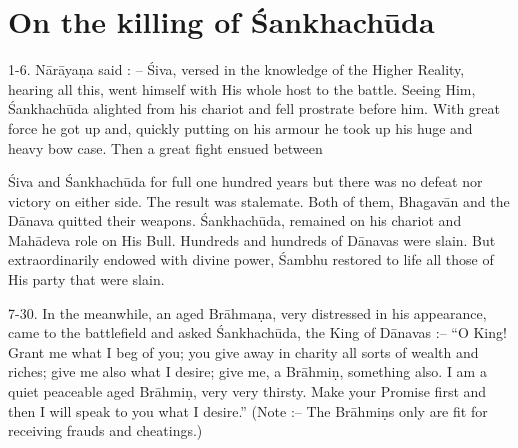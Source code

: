 \chapter{On the killing of \'Sankhach\=uda}

1-6. N\=ar\=aya\d{n}a said : -- \'Siva, versed in the knowledge of the Higher Reality, hearing all this, went himself with His whole host to the battle. Seeing Him, \'Sankhach\=uda alighted from his chariot and fell prostrate before him. With great force he got up and, quickly putting on his armour he took up his huge and heavy bow case. Then a great fight ensued between

\'Siva and \'Sankhach\=uda for full one hundred years but there was no defeat nor victory on either side. The result was stalemate. Both of them, Bhagav\=an and the D\=anava quitted their weapons. \'Sankhach\=uda, remained on his chariot and Mah\=adeva role on His Bull. Hundreds and hundreds of D\=anavas were slain. But extraordinarily endowed with divine power, \'Sambhu restored to life all those of His party that were slain.

7-30. In the meanwhile, an aged Br\=ahma\d{n}a, very distressed in his appearance, came to the battlefield and asked \'Sankhach\=uda, the King of D\=anavas :-- ``O King! Grant me what I beg of you; you give away in charity all sorts of wealth and riches; give me also what I desire; give me, a Br\=ahmi\d{n}, something also. I am a quiet peaceable aged Br\=ahmi\d{n}, very very thirsty. Make your Promise first and then I will speak to you what I desire.'' (Note :-- The Br\=ahmi\d{n}s only are fit for receiving frauds and cheatings.)


